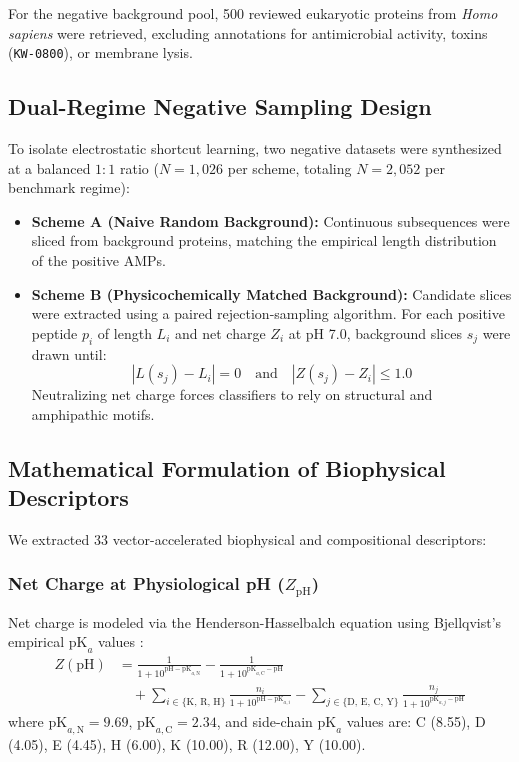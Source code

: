 \documentclass[11pt,a4paper]{article}
\begin{document}
For the negative background pool, 500 reviewed eukaryotic proteins from \textit{Homo sapiens} were retrieved, excluding annotations for antimicrobial activity, toxins (\texttt{KW-0800}), or membrane lysis.

\subsection{Dual-Regime Negative Sampling Design}

To isolate electrostatic shortcut learning, two negative datasets were synthesized at a balanced $1:1$ ratio ($N = 1,026$ per scheme, totaling $N = 2,052$ per benchmark regime):
\begin{itemize}
    \item \textbf{Scheme A (Naive Random Background):} Continuous subsequences were sliced from background proteins, matching the empirical length distribution of the positive AMPs.
    \item \textbf{Scheme B (Physicochemically Matched Background):} Candidate slices were extracted using a paired rejection-sampling algorithm. For each positive peptide $p_i$ of length $L_i$ and net charge $Z_i$ at pH 7.0, background slices $s_j$ were drawn until:
    \begin{equation}
        |L(s_j) - L_i| = 0 \quad \text{and} \quad |Z(s_j) - Z_i| \le 1.0
    \end{equation}
    Neutralizing net charge forces classifiers to rely on structural and amphipathic motifs.
\end{itemize}

\subsection{Mathematical Formulation of Biophysical Descriptors}

We extracted 33 vector-accelerated biophysical and compositional descriptors:

\subsubsection{Net Charge at Physiological pH ($Z_{\text{pH}}$)}
Net charge is modeled via the Henderson-Hasselbalch equation using Bjellqvist's empirical $\text{pK}_a$ values \cite{bjellqvist1993focusing}:
\begin{equation}
\begin{split}
Z(\text{pH}) &= \frac{1}{1 + 10^{\text{pH} - \text{pK}_{a, \text{N}}}} - \frac{1}{1 + 10^{\text{pK}_{a, \text{C}} - \text{pH}}} \\
&\quad + \sum_{i \in \{\text{K, R, H}\}} \frac{n_i}{1 + 10^{\text{pH} - \text{pK}_{a, i}}} - \sum_{j \in \{\text{D, E, C, Y}\}} \frac{n_j}{1 + 10^{\text{pK}_{a, j} - \text{pH}}}
\end{split}
\end{equation}
where $\text{pK}_{a, \text{N}} = 9.69$, $\text{pK}_{a, \text{C}} = 2.34$, and side-chain $\text{pK}_a$ values are: C (8.55), D (4.05), E (4.45), H (6.00), K (10.00), R (12.00), Y (10.00).
\end{document}
